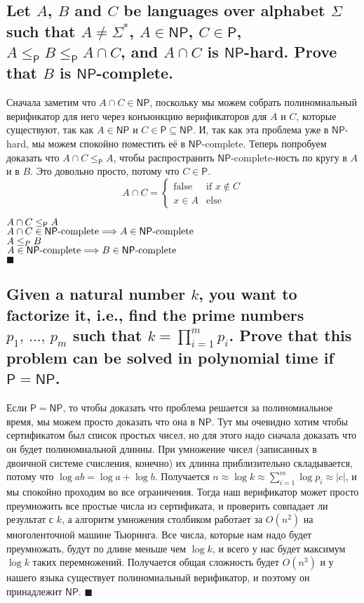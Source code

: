 \documentclass{article}
\newcommand{\NP}{\ensuremath{\mathsf{NP}}}
\renewcommand{\P}{\ensuremath{\mathsf{P}}}
\begin{document}
  \subsection{Let $A$, $B$ and $C$ be languages over alphabet $\Sigma$ such that $A \neq \Sigma^*$, $A \in \NP$, $C \in \P$, $A \leq_\P B \leq_\P A \cap C$, and $A \cap C$ is \NP-hard. Prove that $B$ is \NP-complete.}
  Сначала заметим что $A \cap C \in \NP$, поскольку мы можем собрать полиномиальный верификатор для него через конъюнкцию верификаторов для $A$ и $C$, которые существуют, так как $A \in \NP$ и $C \in \P \subseteq \NP$.
  И, так как эта проблема уже в \NP-hard, мы можем спокойно поместить её в \NP-complete.
  Теперь попробуем доказать что $A \cap C \leq_\P A$, чтобы распространить \NP-complete-ность по кругу в $A$ и в $B$.
  Это довольно просто, потому что $C \in \P$.
  $$
    A \cap C = \begin{cases}
      \text{false} & \text{if } x \not\in C \\
      x \in A & \text{else}
    \end{cases}
  $$

  \noindent
  $\ds A \cap C \leq_\P A$ \\
  $\ds A \cap C \in \NP\textrm{-complete} \Longrightarrow A \in \NP\textrm{-complete}$ \\
  $\displaystyle A \leq_P B$ \\
  $\ds A \in \NP\textrm{-complete} \Longrightarrow B \in \NP\textrm{-complete}$ \\
  $\blacksquare$

  \subsection{Given a natural number $k$, you want to factorize it, i.e., find the prime numbers $p_1,\, \dots,\, p_m$ such that $k = \prod^m_{i=1}p_i$. Prove that this problem can be solved in polynomial time if $\P = \NP$.}
  Если $\P = \NP$, то чтобы доказать что проблема решается за полиномиальное время, мы можем просто доказать что она в \NP.
  Тут мы очевидно хотим чтобы сертификатом был список простых чисел, но для этого надо сначала доказать что он будет полиномиальной длинны.
  При умножение чисел (записанных в двоичной системе счисления, конечно) их длинна приблизительно складывается, потому что $\log ab = \log a + \log b$.
  Получается $n \approx \log k \approx \sum^m_{i=1} \log p_i \approx |c|$, и мы спокойно проходим во все ограничения.
  Тогда наш верификатор может просто преумножить все простые числа из сертификата, и проверить совпадает ли результат с $k$,
  а алгоритм умножения столбиком работает за $O(n^2)$ на многоленточной машине Тьюринга.
  Все числа, которые нам надо будет преумножать, будут по длине меньше чем $\log k$, и всего у нас будет максимум $\log k$ таких перемножений.
  Получается общая сложность будет $O(n^3)$ и у нашего языка существует полиномиальный верификатор, и поэтому он принадлежит \NP.
  $\blacksquare$
\end{document}
